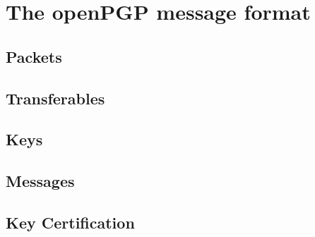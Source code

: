 \chapter{The openPGP message format} \label{chapter:messageformat}








\section{Packets}

\section{Transferables}

\section{Keys}

\section{Messages}



\section{Key Certification}

